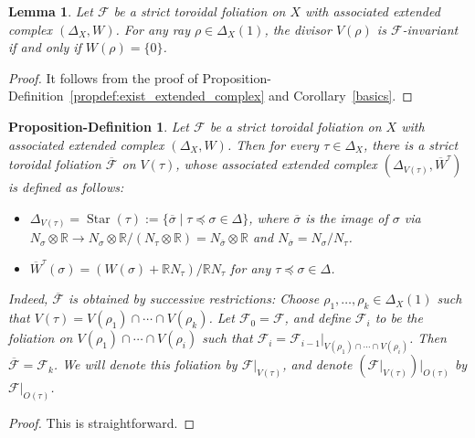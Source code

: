 \documentclass[12pt,reqno]{amsart}
\newtheorem{lemma}[theorem]{Lemma}
\newtheorem{propdef}[theorem]{Proposition-Definition}
\theoremstyle{definition}
\newcommand{\on}{\operatorname}
\newcommand\cF{{\mathcal{F}}}
\newcommand\bR{{\mathbb R}}
\begin{document}
\begin{lemma}\label{lem:complex_div_inv}
    Let $\cF$ be a strict toroidal foliation on $X$ with associated extended complex $(\Delta_X,W)$. 
    For any ray $\rho\in\Delta_X(1)$, the divisor $V(\rho)$ is $\cF$-invariant if and only if $W(\rho)=\{0\}$. 
\end{lemma}
\begin{proof}
    It follows from the proof of Proposition-Definition~\ref{propdef:exist_extended_complex} and Corollary~\ref{basics}. 
\end{proof}

\begin{propdef}\label{lem:restr_blowup_complex}
    Let $\cF$ be a strict toroidal foliation on $X$ with associated extended complex $(\Delta_X,W)$. Then for every $\tau\in\Delta_X$, there is a strict toroidal foliation $\overline{\cF}$ on $V(\tau)$, whose associated extended complex $(\Delta_{V(\tau)},\overline{W}^\tau)$ is defined as follows:
    \begin{itemize}
        \item $\Delta_{V(\tau)}=\on{Star}(\tau):=\{\overline{\sigma}\mid\tau\preceq\sigma\in\Delta\}$, where $\overline{\sigma}$ is the image of $\sigma$ via $N_\sigma\otimes\bR\to N_\sigma\otimes\bR/(N_\tau \otimes\bR)=N_{\overline{\sigma}}\otimes\bR$ and $N_{\overline{\sigma}}=N_\sigma/N_\tau$.
        \item $\overline{W}^\tau(\sigma) = (W(\sigma)+\bR N_\tau)/\bR N_\tau$ for any $\tau\preceq\sigma\in\Delta$.
    \end{itemize}
    Indeed, $\overline{\cF}$ is obtained by successive restrictions: Choose $\rho_1,\ldots,\rho_k\in\Delta_X(1)$ such that $V(\tau)=V(\rho_1)\cap\cdots\cap V(\rho_k)$. Let $\cF_0=\cF$, and define $\cF_i$ to be the foliation on $V(\rho_1)\cap\cdots\cap V(\rho_i)$ such that $\cF_i=\cF_{i-1}\vert_{V(\rho_1)\cap\cdots\cap V(\rho_i)}$. Then $\overline{\cF}=\cF_k$. We will denote this foliation by $\cF\vert_{V(\tau)}$, and denote $(\cF\vert_{V(\tau)})\vert_{O(\tau)}$ by $\cF\vert_{O(\tau)}$.
\end{propdef}
\begin{proof}
    This is straightforward. 
\end{proof}
\end{document}
